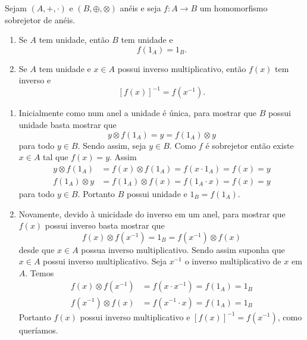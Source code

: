 \begin{proposicao}
    Sejam $(A, +, \cdot)$ e $(B, \oplus, \otimes)$ anéis e seja $f : A \to B$ um homomorfismo sobrejetor de anéis.
    \begin{enumerate}[label={\roman*})]
        \item Se $A$ tem unidade, então $B$ tem unidade e
        \[
            f(1_A) = 1_B.
        \]
        \item Se $A$ tem unidade e $x \in A$ possui inverso multiplicativo, então $f(x)$ tem inverso e
        \[
            [f(x)]^{-1} = f(x^{-1}).
        \]
    \end{enumerate}
\end{proposicao}
\begin{prova}
    \begin{enumerate}[label={\roman*})]
        \item Inicialmente como num anel a unidade é única, para mostrar que $B$ possui unidade basta mostrar que
        \[
            y\otimes f(1_A) = y = f(1_A)\otimes y
        \]
        para todo $y \in B$. Sendo assim, seja $y \in B$. Como $f$ é sobrejetor então existe $x \in A$ tal que $f(x) = y$. Assim
        \begin{align*}
            y\otimes f(1_A) &= f(x) \otimes f(1_A) = f(x\cdot 1_A) = f(x) = y\\
            f(1_A)\otimes y &= f(1_A) \otimes f(x) = f(1_A\cdot x) = f(x) = y
        \end{align*}
        para todo $y \in B$. Portanto $B$ possui unidade e $1_B = f(1_A)$.

        \item Novamente, devido à unicidade do inverso em um anel, para mostrar que $f(x)$ possui inverso basta mostrar que
        \[
            f(x)\otimes f(x^{-1}) = 1_B = f(x^{-1})\otimes f(x)
        \]
        desde que $x \in A$ possua inverso multiplicativo. Sendo assim suponha que $x \in A$ possui inverso multiplicativo. Seja $x^{-1}$ o inverso multiplicativo de $x$ em $A$.
        Temos
        \begin{align*}
            f(x)\otimes f(x^{-1}) &= f(x\cdot x^{-1}) = f(1_A) = 1_B\\
            f(x^{-1})\otimes f(x) &= f(x^{-1}\cdot x) = f(1_A) = 1_B
        \end{align*}
        Portanto $f(x)$ possui inverso multiplicativo e $[f(x)]^{-1} = f(x^{-1})$, como queríamos.
    \end{enumerate}
\end{prova}

